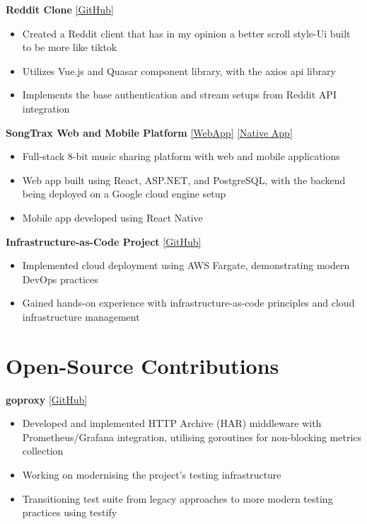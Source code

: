 \documentclass[10pt,a4paper]{article}
\begin{document}
	\textbf{Reddit Clone} \href{https://github.com/CameronBadman/Reddit-Clone}{[GitHub]}
	\begin{itemize}[label=\textbullet, itemsep=0.05cm]
		\item Created a Reddit client that has in my opinion a better scroll style-Ui built to be more like tiktok 
		\item Utilizes Vue.js and Quasar component library, with the axios api library
		\item Implements the base authentication and stream setups from Reddit API integration
	\end{itemize}
	
	\textbf{SongTrax Web and Mobile Platform} \href{https://github.com/CameronBadman/Songtrax-WebApp}{[WebApp]} \href{https://github.com/CameronBadman/Songtrax-NativeApp}{[Native App]}
	\begin{itemize}[label=\textbullet, itemsep=0.05cm]
		\item Full-stack 8-bit music sharing platform with web and mobile applications
		\item Web app built using React, ASP.NET, and PostgreSQL, with the backend being deployed on a Google cloud engine setup
		\item Mobile app developed using React Native
	\end{itemize}
	
	\textbf{Infrastructure-as-Code Project} \href{https://github.com/CameronBadman/Terraform-docker-API}{[GitHub]}
	\begin{itemize}[label=\textbullet, itemsep=0.05cm]
		\item Implemented cloud deployment using AWS Fargate, demonstrating modern DevOps practices
		\item Gained hands-on experience with infrastructure-as-code principles and cloud infrastructure management
	\end{itemize}
	
	\section{Open-Source Contributions}
	\textbf{goproxy} \href{https://github.com/elazarl/goproxy}{[GitHub]}
	\begin{itemize}[label=\textbullet, itemsep=0.05cm]
		\item Developed and implemented HTTP Archive (HAR) middleware with Prometheus/Grafana integration, utilising goroutines for non-blocking metrics collection
		\item Working on modernising the project's testing infrastructure
		\item Transitioning test suite from legacy approaches to more modern testing practices using testify
	\end{itemize}
	
\end{document}
